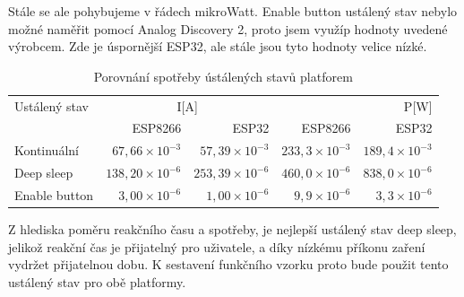 \documentclass[a4paper, 12pt]{report}
\begin{document}
    Stále se ale pohybujeme v řádech mikroWatt.
    Enable button ustálený stav nebylo možné naměřit pomocí Analog Discovery 2, proto jsem využíp hodnoty uvedené výrobcem.
    Zde je úspornější ESP32, ale stále jsou tyto hodnoty velice nízké.
    \begin{table}[h!]
        \centering
        \caption{Porovnání spotřeby ústálených stavů platforem}
        \begin{tabular}{||l|r r|r r||}
            \hline
            Ustálený stav & \multicolumn{2}{c|}{I[A]} & \multicolumn{2}{C||}{P[W]}   \\
                          & ESP8266        & ESP32   & ESP8266 & ESP32 \\
            \hline
            Kontinuální   & $67,66 \times 10^{-3}$   & $57,39 \times 10^{-3}$ & $233,3 \times 10^{-3}$& $189,4 \times 10^{-3}$ \\
            Deep sleep       & $138,20 \times 10^{-6}$ & $253,39 \times 10^{-6}$ & $460,0 \times 10^{-6}$&$838,0 \times 10^{-6}$\\
            Enable button    &  $3,00 \times 10^{-6}$   & $1,00 \times 10^{-6}$ & $9,9 \times 10^{-6}$&$3,3 \times 10^{-6}$\\
            \hline
        \end{tabular}
        \label{tab:porovnani-klidove-rezimy-spotreba}
    \end{table}\par
    Z hlediska poměru reakčního času a spotřeby, je nejlepší ustálený stav deep sleep, jelikož reakční čas je přijatelný pro uživatele, a díky nízkému příkonu zaření vydržet přijatelnou dobu.
    K sestavení funkčního vzorku proto bude použit tento ustálený stav pro obě platformy.
\end{document}
